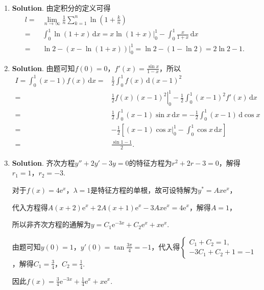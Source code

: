 \documentclass[../Main.tex]{subfiles}
\begin{document}
\begin{enumerate}
    \item \textbf{Solution}. 由定积分的定义可得
          \[
              \begin{aligned}
                  l= & \lim_{n\to\infty}\frac{1}{n}\sum_{k=1}^{n}\ln\left(1+\frac{k}{n}\right)                            \\
                  =  & \int_{0}^{1}\ln(1+x)\,\mathrm{d}x = x\ln(1+x)\bigg|_{0}^{1}-\int_{0}^{1}\frac{x}{1+x}\,\mathrm{d}x \\
                  =  & \ln 2 -\left(x-\ln(1+x)\right)\bigg|_{0}^{1}= \ln 2 - (1-\ln 2) = 2\ln 2 -1.
              \end{aligned}
          \]

    \item \textbf{Solution}. 由题可知$f(0)=0$，$f'(x)=\frac{\sin x}{1-x}$，所以
          \[
              \begin{aligned}
                  I = \int_{0}^{1}(x-1) f(x)\,\mathrm{d}x = & \frac{1}{2}\int_{0}^{1}f(x)\,\mathrm{d}(x-1)^{2}                                                  \\
                  =                                         & \left.\frac{1}{2}f(x)(x-1)^{2}\right|_{0}^{1}-\frac{1}{2}\int_{0}^{1}(x-1)^{2}f'(x)\,\mathrm{d}x  \\
                  =                                         & \frac{1}{2}\int_{0}^{1}(x-1)\sin x\,\mathrm{d}x = -\frac{1}{2}\int_{0}^{1}(x-1)\,\mathrm{d}\cos x \\
                  =                                         & -\frac{1}{2}\left[(x-1)\cos x\bigg|_{0}^{1}-\int_{0}^{1}\cos x\,\mathrm{d}x\right]                \\
                  =                                         & \frac{\sin 1-1}{2}.
              \end{aligned}
          \]

    \item \textbf{Solution}. 齐次方程$y''+2y'-3y=0$的特征方程为$r^{2}+2r-3=0$，解得$r
                  _{1}=1$，$r_{2}=-3$.

          对于$f(x)=4\mathrm{e}^{x}$，$\lambda = 1$是特征方程的单根，故可设特解为$y^{*}
              =Ax\mathrm{e}^{x}$，

          代入方程得$A(x+2)\mathrm{e}^{x}+2A(x+1)\mathrm{e}^{x}-3Ax\mathrm{e}^{x}=4\mathrm{e}
              ^{x}$，解得$A=1$，

          所以非齐次方程的通解为$y=C_{1}\mathrm{e}^{-3x}+C_{2}\mathrm{e}^{x}+x\mathrm{e}
              ^{x}$.

          由题可知$y(0)=1$，$y'(0)=\tan\frac{3\pi}{4}=-1$，代入得$\begin{cases}
                  C_{1}+C_{2}=1, \\
                  -3C_{1}+C_{2}+1=-1
              \end{cases}$，解得$C_{1}=\frac{3}{4}$，$C_{2}=\frac{1}{4}$.

          因此$f(x)=\frac{3}{4}\mathrm{e}^{-3x}+\frac{1}{4}\mathrm{e}^{x}+x\mathrm{e}
              ^{x}$.
\end{enumerate}
\end{document}
